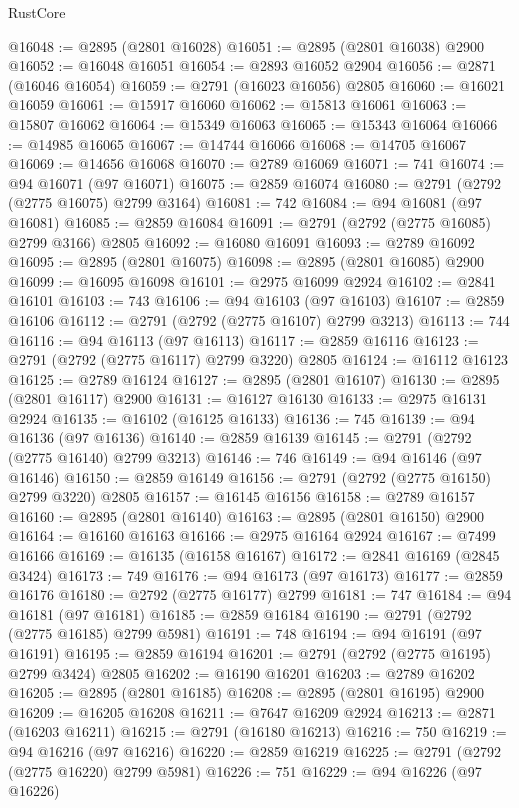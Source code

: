 \begin{lexlean}{RustCore}
\begin{coremodule}
@16048 := @2895 (@2801 @16028)
@16051 := @2895 (@2801 @16038) @2900
@16052 := @16048 @16051
@16054 := @2893 @16052 @2904
@16056 := @2871 (@16046 @16054)
@16059 := @2791 (@16023 @16056) @2805
@16060 := @16021 @16059
@16061 := @15917 @16060
@16062 := @15813 @16061
@16063 := @15807 @16062
@16064 := @15349 @16063
@16065 := @15343 @16064
@16066 := @14985 @16065
@16067 := @14744 @16066
@16068 := @14705 @16067
@16069 := @14656 @16068
@16070 := @2789 @16069
@16071 := 741
@16074 := @94 @16071 (@97 @16071)
@16075 := @2859 @16074
@16080 := @2791 (@2792 (@2775 @16075) @2799 @3164)
@16081 := 742
@16084 := @94 @16081 (@97 @16081)
@16085 := @2859 @16084
@16091 := @2791 (@2792 (@2775 @16085) @2799 @3166) @2805
@16092 := @16080 @16091
@16093 := @2789 @16092
@16095 := @2895 (@2801 @16075)
@16098 := @2895 (@2801 @16085) @2900
@16099 := @16095 @16098
@16101 := @2975 @16099 @2924
@16102 := @2841 @16101
@16103 := 743
@16106 := @94 @16103 (@97 @16103)
@16107 := @2859 @16106
@16112 := @2791 (@2792 (@2775 @16107) @2799 @3213)
@16113 := 744
@16116 := @94 @16113 (@97 @16113)
@16117 := @2859 @16116
@16123 := @2791 (@2792 (@2775 @16117) @2799 @3220) @2805
@16124 := @16112 @16123
@16125 := @2789 @16124
@16127 := @2895 (@2801 @16107)
@16130 := @2895 (@2801 @16117) @2900
@16131 := @16127 @16130
@16133 := @2975 @16131 @2924
@16135 := @16102 (@16125 @16133)
@16136 := 745
@16139 := @94 @16136 (@97 @16136)
@16140 := @2859 @16139
@16145 := @2791 (@2792 (@2775 @16140) @2799 @3213)
@16146 := 746
@16149 := @94 @16146 (@97 @16146)
@16150 := @2859 @16149
@16156 := @2791 (@2792 (@2775 @16150) @2799 @3220) @2805
@16157 := @16145 @16156
@16158 := @2789 @16157
@16160 := @2895 (@2801 @16140)
@16163 := @2895 (@2801 @16150) @2900
@16164 := @16160 @16163
@16166 := @2975 @16164 @2924
@16167 := @7499 @16166
@16169 := @16135 (@16158 @16167)
@16172 := @2841 @16169 (@2845 @3424)
@16173 := 749
@16176 := @94 @16173 (@97 @16173)
@16177 := @2859 @16176
@16180 := @2792 (@2775 @16177) @2799
@16181 := 747
@16184 := @94 @16181 (@97 @16181)
@16185 := @2859 @16184
@16190 := @2791 (@2792 (@2775 @16185) @2799 @5981)
@16191 := 748
@16194 := @94 @16191 (@97 @16191)
@16195 := @2859 @16194
@16201 := @2791 (@2792 (@2775 @16195) @2799 @3424) @2805
@16202 := @16190 @16201
@16203 := @2789 @16202
@16205 := @2895 (@2801 @16185)
@16208 := @2895 (@2801 @16195) @2900
@16209 := @16205 @16208
@16211 := @7647 @16209 @2924
@16213 := @2871 (@16203 @16211)
@16215 := @2791 (@16180 @16213)
@16216 := 750
@16219 := @94 @16216 (@97 @16216)
@16220 := @2859 @16219
@16225 := @2791 (@2792 (@2775 @16220) @2799 @5981)
@16226 := 751
@16229 := @94 @16226 (@97 @16226)

\end{coremodule}
\end{lexlean}
